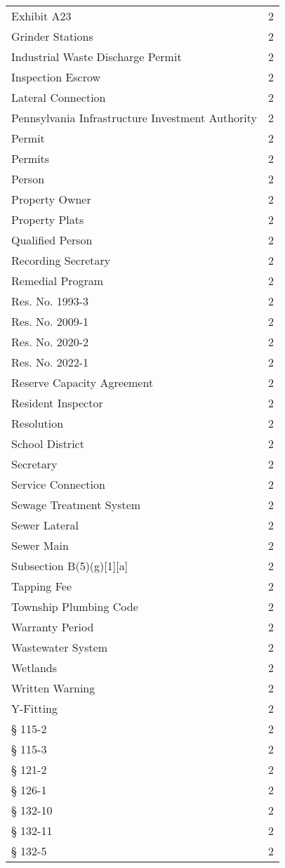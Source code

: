\begin{longtable}{p{} p{}}
Exhibit A23 & 2 \\
Grinder Stations & 2 \\
Industrial Waste Discharge Permit & 2 \\
Inspection Escrow & 2 \\
Lateral Connection & 2 \\
Pennsylvania Infrastructure Investment Authority & 2 \\
Permit & 2 \\
Permits & 2 \\
Person & 2 \\
Property Owner & 2 \\
Property Plats & 2 \\
Qualified Person & 2 \\
Recording Secretary & 2 \\
Remedial Program & 2 \\
Res. No. 1993-3 & 2 \\
Res. No. 2009-1 & 2 \\
Res. No. 2020-2 & 2 \\
Res. No. 2022-1 & 2 \\
Reserve Capacity Agreement & 2 \\
Resident Inspector & 2 \\
Resolution & 2 \\
School District & 2 \\
Secretary & 2 \\
Service Connection & 2 \\
Sewage Treatment System & 2 \\
Sewer Lateral & 2 \\
Sewer Main & 2 \\
Subsection B(5)(g)[1][a] & 2 \\
Tapping Fee & 2 \\
Township Plumbing Code & 2 \\
Warranty Period & 2 \\
Wastewater System & 2 \\
Wetlands & 2 \\
Written Warning & 2 \\
Y-Fitting & 2 \\
§ 115-2 & 2 \\
§ 115-3 & 2 \\
§ 121-2 & 2 \\
§ 126-1 & 2 \\
§ 132-10 & 2 \\
§ 132-11 & 2 \\
§ 132-5 & 2 \\

\end{longtable}
